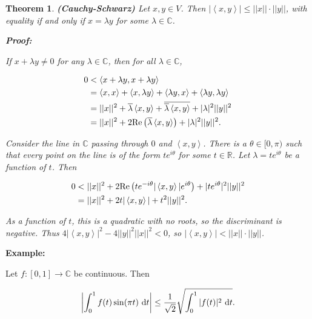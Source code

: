 \documentclass{article}
\theoremstyle{colontheorem}
\newtheorem{theorem}{Theorem}[section]
\newenvironment{Theorem}
{
	\begin{mdframed}[backgroundcolor=TheoremOrange!10]
	\begin{theorem}
}
{
	\end{theorem}
	\end{mdframed}
	
	\vspace{.15in}
}
\newenvironment{Proof}
{
	\begin{mdframed}[backgroundcolor=ProofPurple!10]
	\textbf{Proof:}%
}
{
	\end{mdframed}
	
	\vspace{.085in}
}
\newenvironment{Example}
{
	\begin{mdframed}
	\textbf{Example:}%
}
{
	\end{mdframed}
	
	\vspace{.15in}
}
\begin{document}
\begin{Theorem}
	
	\textbf{(Cauchy-Schwarz)} Let $x, y \in V$. Then $|\left< x, y \right> | \leq ||x||\cdot||y||$, with equality if and only if $x = \lambda y$ for some $\lambda \in \mathbb{C}$.
	
	\begin{Proof}
		If $x + \lambda y \neq 0$ for any $\lambda \in \mathbb{C}$, then for all $\lambda \in \mathbb{C}$,
		
		\begin{align*}
			0 &< \left< x + \lambda y, x + \lambda y \right>\\
			&= \left< x, x \right> + \left< x, \lambda y \right> + \left< \lambda y, x \right> + \left< \lambda y, \lambda y \right>\\
			&= ||x||^2 + \overline{\lambda} \left< x, y \right> + \overline{\overline{\lambda} \left< x, y \right>} + |\lambda|^2 ||y||^2\\
			&= ||x||^2 + 2\textnormal{Re} \left( \overline{\lambda} \left< x, y \right> \right) + |\lambda|^2 ||y||^2.
		\end{align*}
		
		Consider the line in $\mathbb{C}$ passing through $0$ and $\left< x, y \right>$. There is a $\theta \in [0, \pi)$ such that every point on the line is of the form $t e^{i \theta}$ for some $t \in \mathbb{R}$. Let $\lambda = t e^{i \theta}$ be a function of $t$. Then
		
		\begin{align*}
			0 &< ||x||^2 + 2\textnormal{Re} \left( t e^{-i \theta} | \left< x, y \right> | e^{i \theta} \right) + |t e^{i \theta}|^2 ||y||^2\\
			&= ||x||^2 + 2t |\left< x, y \right> | + t^2 ||y||^2.
		\end{align*}
		
		As a function of $t$, this is a quadratic with no roots, so the discriminant is negative. Thus $4 | \left< x, y \right> |^2  - 4 ||y||^2 ||x||^2 < 0$, so $| \left< x, y \right> | < ||x||\cdot||y||$.
		
	\end{Proof} 
	
\end{Theorem}



\begin{Example}
	Let $f : [0, 1] \longrightarrow \mathbb{C}$ be continuous. Then
	
	$$
		\left| \int_0^1 f(t) \sin(\pi t)\ \textnormal{d}t \right| \leq \frac{1}{\sqrt{2}} \sqrt{\int_0^1 |f(t)|^2\ \textnormal{d}t}.
	$$
	
\end{Example}
\end{document}
